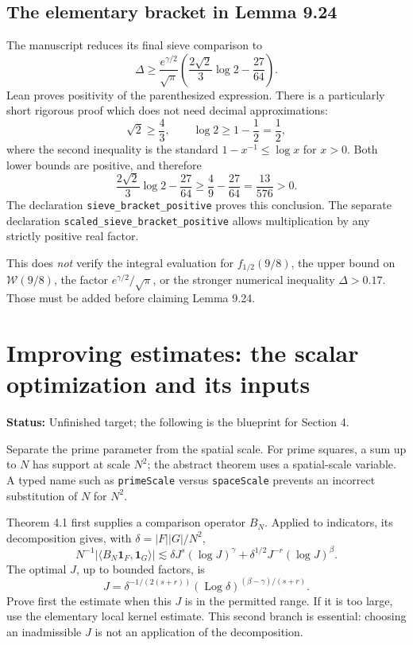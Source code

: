 \documentclass[11pt]{article}
\newcommand{\one}{\mathbf 1}\newcommand{\abs}[1]{\left|#1\right|}
\newcommand{\lean}[1]{\nolinkurl{#1}}
\newcommand{\status}[1]{\textbf{Status:} #1.}
\newcommand{\page}{\newpage}
\begin{document}
\subsection*{The elementary bracket in Lemma 9.24}
The manuscript reduces its final sieve comparison to
\[
 \Delta\ge\frac{e^{\gamma/2}}{\sqrt\pi}
 \left(\frac{2\sqrt2}{3}\log2-\frac{27}{64}\right).
\]
Lean proves positivity of the parenthesized expression. There is a particularly
short rigorous proof which does not need decimal approximations:
\[
 \sqrt2\ge\frac43,\qquad \log2\ge1-\frac12=\frac12,
\]
where the second inequality is the standard \(1-x^{-1}\le\log x\) for \(x>0\).
Both lower bounds are positive, and therefore
\[
 \frac{2\sqrt2}{3}\log2-\frac{27}{64}
 \ge\frac49-\frac{27}{64}=\frac{13}{576}>0.
\]
The declaration \lean{sieve_bracket_positive} proves this conclusion. The separate
declaration \lean{scaled_sieve_bracket_positive} allows multiplication by any
strictly positive real factor.

This does \emph{not} verify the integral evaluation for \(f_{1/2}(9/8)\), the upper
bound on \(\mathcal W(9/8)\), the factor \(e^{\gamma/2}/\sqrt\pi\), or the stronger
numerical inequality \(\Delta>0.17\). Those must be added before claiming Lemma 9.24.

\page
\section{Improving estimates: the scalar optimization and its inputs}
\status{Unfinished target; the following is the blueprint for Section 4}

Separate the prime parameter from the spatial scale. For prime squares, a sum up
to \(N\) has support at scale \(N^2\); the abstract theorem uses a spatial-scale
variable. A typed name such as \lean{primeScale} versus \lean{spaceScale} prevents
an incorrect substitution of \(N\) for \(N^2\).

Theorem 4.1 first supplies a comparison operator \(B_N\). Applied to indicators,
its decomposition gives, with \(\delta=|F||G|/N^2\),
\[
 N^{-1}|\langle B_N\one_F,\one_G\rangle|
 \lesssim\delta J^s(\log J)^\gamma+
 \delta^{1/2}J^{-r}(\log J)^\beta.
\]
The optimal \(J\), up to bounded factors, is
\[
 J=\delta^{-1/(2(s+r))}(\operatorname{Log}\delta)^{(\beta-\gamma)/(s+r)}.
\]
Prove first the estimate when this \(J\) is in the permitted range. If it is too
large, use the elementary local kernel estimate. This second branch is essential:
choosing an inadmissible \(J\) is not an application of the decomposition.
\end{document}
